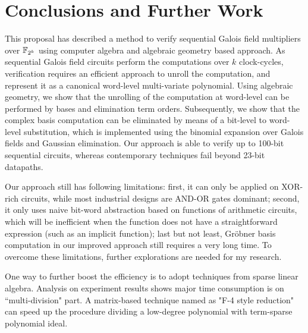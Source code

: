 \section{Conclusions and Further Work}\label{sec:concl}

This proposal has described a method to verify sequential Galois field
multipliers over ${\mathbb{F}}_{2^k}$ using computer algebra and algebraic geometry
based approach. As sequential Galois field circuits perform the
computations over $k$ clock-cycles, verification requires an efficient
approach to unroll the computation, and represent it as a canonical
word-level multi-variate polynomial. Using algebraic geometry, we show
that the unrolling of the computation at word-level can be performed by
\Grobner bases and elimination term orders. Subsequently, we show
that the complex \Grobner basis computation can be eliminated by means
of a bit-level to word-level substitution, which is implemented using
the binomial expansion over Galois fields and Gaussian
elimination. Our approach is able to verify up to 100-bit sequential
circuits, whereas contemporary techniques fail beyond 23-bit
datapaths.  

Our approach still has following limitations: first, it can only be applied
on XOR-rich circuits, while most industrial designs are AND-OR gates dominant;
second, it only uses naive bit-word abstraction based on functions of arithmetic
circuits, which will be inefficient when the function does not have a straightforward
expression (such as an implicit function); last but not least, Gr\"obner basis computation
in our improved approach still requires a very long time. To overcome these limitations,
further explorations are needed for my research. 

One way to further boost the efficiency is to adopt techniques from sparse linear algebra.
Analysis on experiment results shows major time consumption is on ``multi-division" part.
A matrix-based technique named as "F-4 style reduction" \cite{F4reduce} can speed up the procedure
dividing a low-degree polynomial with term-sparse polynomial ideal. 